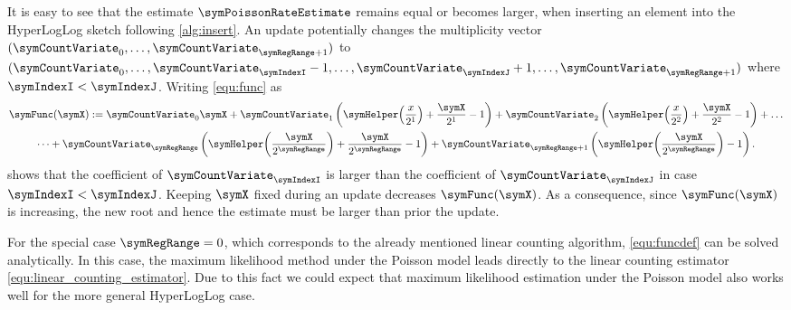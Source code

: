 \documentclass[a4paper]{scrartcl}
\begin{document}
It is easy to see that the estimate $\symPoissonRateEstimate$ remains equal or becomes larger, when inserting an element into the HyperLogLog sketch following \cref{alg:insert}. An update potentially changes the multiplicity vector $(\symCountVariate_0,\ldots,\symCountVariate_{\symRegRange+1})$ to $(\symCountVariate_0,\ldots,\symCountVariate_\symIndexI-1,\ldots,\symCountVariate_\symIndexJ+1,\ldots,\symCountVariate_{\symRegRange+1})$ where $\symIndexI < \symIndexJ$. Writing \eqref{equ:func} as 
\begin{multline}
\symFunc(\symX)
:=
\symCountVariate_0 \symX
+
\symCountVariate_1 \left(
\symHelper\!\left(\frac{x}{2^1}\right)
+\frac{\symX}{2^1}-1
\right)
+
\symCountVariate_2 \left(
\symHelper\!\left(\frac{x}{2^2}\right)
+\frac{\symX}{2^2}-1
\right)
+
\ldots
\\
\dots
+
\symCountVariate_\symRegRange
\left(
\symHelper\!\left(\frac{\symX}{2^\symRegRange}\right)
+\frac{\symX}{2^\symRegRange}-1
\right)
+
\symCountVariate_{\symRegRange+1}
\left(
\symHelper\!\left(\frac{\symX}{2^{\symRegRange}}\right)
-1
\right).
\end{multline}
shows that the coefficient of $\symCountVariate_\symIndexI$ is larger than the coefficient of $\symCountVariate_\symIndexJ$ in case $\symIndexI < \symIndexJ$. Keeping $\symX$ fixed during an update decreases $\symFunc(\symX)$. As a consequence, since $\symFunc(\symX)$ is increasing, the new root and hence the estimate must be larger than prior the update.

For the special case $\symRegRange=0$, which corresponds to the already mentioned linear counting algorithm, \eqref{equ:funcdef} can be solved analytically. In this case, the maximum likelihood method under the Poisson model leads directly to the linear counting estimator \eqref{equ:linear_counting_estimator}. Due to this fact we could expect that maximum likelihood estimation under the Poisson model also works well for the more general HyperLogLog case.
\end{document}
